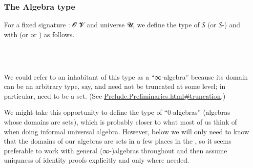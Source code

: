 \subsubsection{The Algebra type}\label{algebra-types}

For a fixed signature  \as :  \ab 𝓞 \ab 𝓥 and universe \ab 𝓤, we define the type of  \ab 𝑆 (or \ab 𝑆-) and with  (or  or )  as follows.
\ccpad
\begin{code}%
\>[0]\AgdaSpace{}%
\AgdaSymbol{:}\AgdaSpace{}%
\AgdaSymbol{(}\AgdaSpace{}%
\AgdaSymbol{:}\AgdaSpace{}%
\AgdaSymbol{)(}\AgdaSpace{}%
\AgdaSymbol{:}\AgdaSpace{}%
\AgdaSpace{}%
\AgdaSpace{}%
\AgdaSymbol{)}\AgdaSpace{}%
%
\>[47]\AgdaSpace{}%
\AgdaSpace{}%
\AgdaSpace{}%
\AgdaSpace{}%
\AgdaSpace{}%
\AgdaSpace{}%
\<%
\\
%
\\[\AgdaEmptyExtraSkip]%
\>[0]\AgdaSpace{}%
%
\>[11]\AgdaSpace{}%
\AgdaSymbol{=}\AgdaSpace{}%
\AgdaSpace{}%
\AgdaSpace{}%
\AgdaSpace{}%
\AgdaSpace{}%
\AgdaSpace{}%
\AgdaFunction{,}\AgdaSpace{}%
\AgdaSymbol{((}\AgdaSpace{}%
\AgdaSymbol{:}\AgdaSpace{}%
\AgdaSpace{}%
\AgdaSpace{}%
\AgdaSymbol{)}\AgdaSpace{}%
\AgdaSpace{}%
\AgdaSpace{}%
\AgdaSymbol{(}\AgdaSpace{}%
\AgdaSpace{}%
\AgdaSpace{}%
\AgdaSymbol{)}\AgdaSpace{}%
\AgdaSymbol{)}\<%
\end{code}
\ccpad
We could refer to an inhabitant of this type as a ``∞-algebra'' because its domain can be an arbitrary type, say,  and need not be truncated at some level; in particular,  need to be a set. (See \href{https://ualib.gitlab.io/Prelude.Preliminaries.html\#truncation}{Prelude.Preliminaries.html\#truncation}.)

We might take this opportunity to define the type of ``0-algebras'' (algebras whose domains are sets), which is probably closer to what most of us think of when doing informal universal algebra. However, below we will only need to know that the domains of our algebras are sets in a few places in the \ualib, so it seems preferable to work with
general (∞-)algebras throughout and then assume uniquness of identity proofs explicitly and only where needed.

